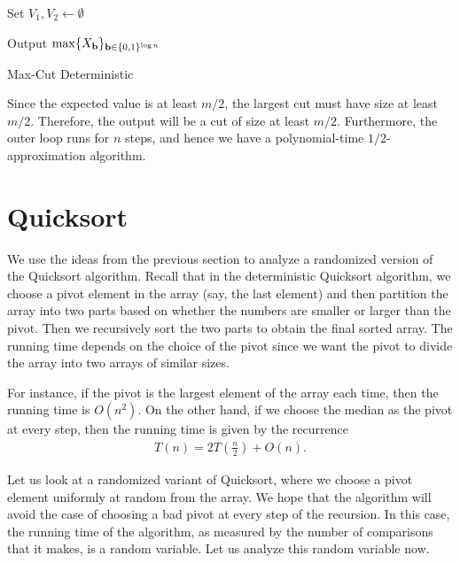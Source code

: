 \begin{algorithm}
	
	Set $V_1, V_2 \gets \emptyset$
	
	
	Output $\max \{X_{\mathbf{b}}\}_{\mathbf{b} \in \{0,1\}^{\log n}}$

	\caption{Max-Cut Deterministic}
	\label{alg:maxcut-det}
\end{algorithm}

Since the expected value is at least $m/2$, the largest cut must have size at least $m/2$. Therefore, the output will be a cut of size at least $m/2$. Furthermore, the outer loop runs for $n$ steps, and hence we have a polynomial-time $1/2$-approximation algorithm.

\section{Quicksort}

We use the ideas from the previous section to analyze a randomized version of the Quicksort algorithm. Recall that in the deterministic Quicksort algorithm, we choose a pivot element in the array (say, the last element) and then partition the array into two parts based on whether the numbers are smaller or larger than the pivot. Then we recursively sort the two parts to obtain the final sorted array. The running time depends on the choice of the pivot since we want the pivot to divide the array into two arrays of similar sizes. 

For instance, if the pivot is the largest element of the array each time, then the running time is $O(n^2)$. On the other hand, if we choose the median as the pivot at every step, then the running time is given by the recurrence
\begin{align*}
	T(n) = 2T\left( \frac{n}{2} \right) + O(n).
\end{align*}

Let us look at a randomized variant of Quicksort, where we choose a pivot element uniformly at random from the array. We hope that the algorithm will avoid the case of choosing a bad pivot at every step of the recursion. In this case, the running time of the algorithm, as measured by the number of comparisons that it makes, is a random variable. Let us analyze this random variable now.

